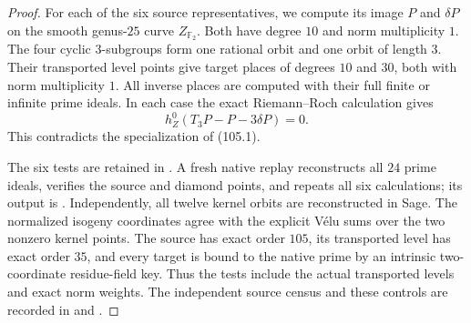 \begin{proof}
For each of the six source representatives, we compute its image
$P$ and $\delta P$ on the smooth genus-$25$ curve
$Z_{\mathbb F_2}$. Both have degree $10$ and norm multiplicity $1$.
The four cyclic $3$-subgroups form one rational orbit and one orbit
of length $3$. Their transported level points give target places of
degrees $10$ and $30$, both with norm multiplicity $1$. All inverse
places are computed with their full finite or infinite prime ideals.
In each case the exact Riemann--Roch calculation gives
\[
              h^0_Z(T_3P-P-3\delta P)=0.               \tag{105.2}
\]
This contradicts the specialization of (105.1).

The six tests are retained in . A fresh native
replay reconstructs all $24$ prime ideals, verifies the source and
diamond points, and repeats all six calculations; its output is
. Independently, all twelve kernel orbits
are reconstructed in Sage. The normalized isogeny coordinates agree
with the explicit V\'{e}lu sums over the two nonzero kernel points.
The source has exact order $105$, its transported level has exact
order $35$, and every target is bound to the native prime by an
intrinsic two-coordinate residue-field key. Thus the tests include
the actual transported levels and exact norm weights. The independent
source census and these controls are recorded in
 and
.
\end{proof}
